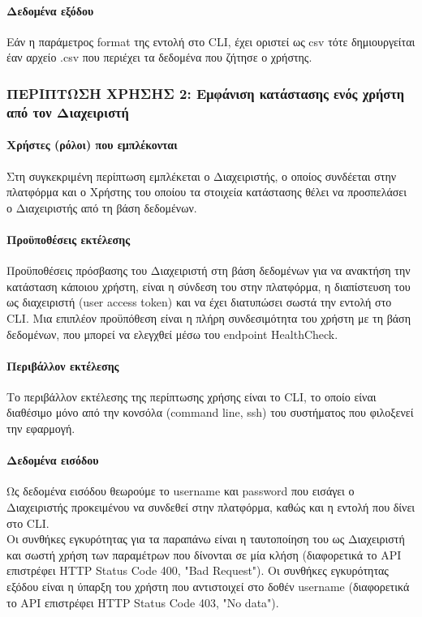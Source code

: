\documentclass[a4paper,12pt, oneside]{article}
\begin{document}
\paragraph{Δεδομένα εξόδου}
Εάν η παράμετρος \textlatin{format} της εντολή στο \textlatin{CLI}, έχει οριστεί ως \textlatin{csv} τότε δημιουργείται έαν αρχείο \textlatin{.csv} που περιέχει τα δεδομένα που ζήτησε ο χρήστης.



\newpage
\subsubsection{ΠΕΡΙΠΤΩΣΗ ΧΡΗΣΗΣ 2: Εμφάνιση κατάστασης ενός χρήστη από τον Διαχειριστή}
\paragraph{Χρήστες (ρόλοι) που εμπλέκονται}
Στη συγκεκριμένη περίπτωση εμπλέκεται ο Διαχειριστής, ο οποίος συνδέεται στην πλατφόρμα και ο Χρήστης του οποίου τα στοιχεία κατάστασης θέλει να προσπελάσει ο Διαχειριστής από τη βάση δεδομένων.

\paragraph{Προϋποθέσεις εκτέλεσης}
Προϋποθέσεις πρόσβασης του Διαχειριστή στη βάση δεδομένων για να ανακτήση την κατάσταση κάποιου χρήστη, είναι η σύνδεση του στην πλατφόρμα, η διαπίστευση του ως διαχειριστή \textlatin{(user access token)} και να έχει διατυπώσει σωστά την εντολή στο \textlatin{CLI}. Μια επιπλέον προϋπόθεση είναι η πλήρη συνδεσιμότητα του χρήστη με τη βάση δεδομένων, που μπορεί να ελεγχθεί μέσω του \textlatin{endpoint HealthCheck}.

\paragraph{Περιβάλλον εκτέλεσης}
Το περιβάλλον εκτέλεσης της περίπτωσης χρήσης είναι το \textlatin{CLI}, το οποίο είναι διαθέσιμο μόνο από την κονσόλα \textlatin{(command line, ssh)} του συστήματος που φιλοξενεί την εφαρμογή.

\paragraph{Δεδομένα εισόδου}
Ως δεδομένα εισόδου θεωρούμε το  \textlatin{username} και  \textlatin{password} που εισάγει ο Διαχειριστής προκειμένου να συνδεθεί στην πλατφόρμα, καθώς και η εντολή που δίνει στο  \textlatin{CLI}. \\
Οι συνθήκες εγκυρότητας για τα παραπάνω είναι η ταυτοποίηση του ως Διαχειριστή και σωστή χρήση των παραμέτρων που δίνονται σε μία κλήση (διαφορετικά  το  \textlatin{API} επιστρέφει  \textlatin{HTTP Status Code 400, "Bad Request").}
Οι συνθήκες εγκυρότητας εξόδου είναι η ύπαρξη του χρήστη που αντιστοιχεί στο δοθέν \textlatin{username} (διαφορετικά  το  \textlatin{API} επιστρέφει  \textlatin{HTTP Status Code 403, "No data").}
\end{document}
